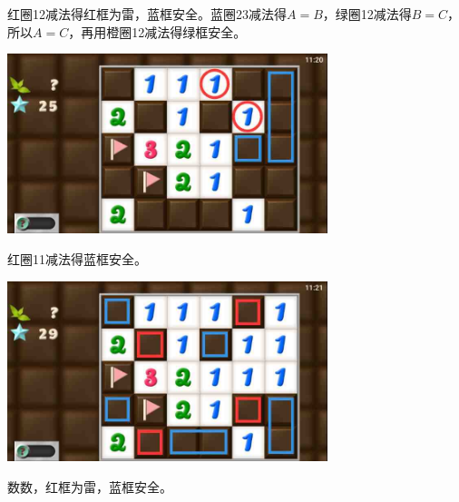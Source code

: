 红圈12减法得红框为雷，蓝框安全。蓝圈23减法得$A=B$，绿圈12减法得$B=C$，所以$A=C$，再用橙圈12减法得绿框安全。
\begin{center}
    \includegraphics[width=0.7\textwidth]{puzzlelow/215-5.jpg}
\end{center}
红圈11减法得蓝框安全。
\begin{center}
    \includegraphics[width=0.7\textwidth]{puzzlelow/215-6.jpg}
\end{center}
数数，红框为雷，蓝框安全。

